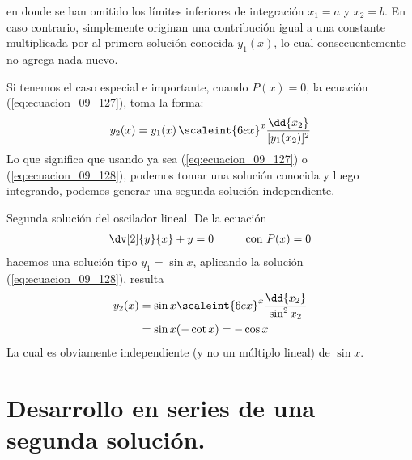 en donde se han omitido los límites inferiores de integración $x_{1} = a$ y $x_{2} = b$. En caso contrario, simplemente originan una contribución igual a una constante multiplicada por al primera solución conocida $y_{1} (x)$, lo cual consecuentemente no agrega nada nuevo.
\par
Si tenemos el caso especial e importante, cuando $P (x) = 0$, la ecuación (\ref{eq:ecuacion_09_127}), toma la forma:
\begin{align}
y_{2} (x) =  y_{1} (x) \, \scaleint{6ex}^{x} \dfrac{\dd{x_{2}}}{[y_{1} (x_{2})]^{2}}
\label{eq:ecuacion_09_128}
\end{align}
Lo que significa que usando ya sea (\ref{eq:ecuacion_09_127}) o (\ref{eq:ecuacion_09_128}), podemos tomar una solución conocida y luego integrando, podemos generar una segunda solución independiente.
\par
\begin{ejemplo}{Segunda solución del oscilador lineal.}
De la ecuación
\begin{align*}
\dv[2]{y}{x} + y = 0 \hspace{1cm} \text{con } P (x) = 0
\end{align*}
hacemos una solución tipo $y_{1} = \sin x$, aplicando la solución (\ref{eq:ecuacion_09_128}), resulta
\begin{align*}
y_{2} (x) &= \sin x \scaleint{6ex}^{x} \dfrac{\dd{x_{2}}}{\sin^{2} x_{2}} \\
&= \sin x (-\cot x) = - \cos x
\end{align*}
La cual es obviamente independiente (y no un múltiplo lineal) de $\sin x$.
\end{ejemplo}

\section{Desarrollo en series de una segunda solución.}

